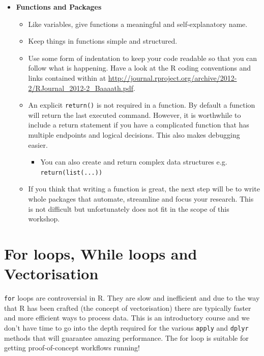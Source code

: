 \documentclass[a4paper]{book}
\providecommand{\tightlist}{%
  \setlength{\itemsep}{0pt}\setlength{\parskip}{0pt}}
\newenvironment{rmdblock}[1]
  {\vspace{1.5em}\begin{shaded*}
  \begin{itemize}
  \renewcommand{\labelitemi}{
    \raisebox{-.7\height}[0pt][0pt]{
      {\setkeys{Gin}{width=3em,keepaspectratio}\texttt{[image: images/\#1]}}
    }
  }
  \item
  }
  {
  \end{itemize}
  \end{shaded*}
  }
\newenvironment{rmdtip}
  {\begin{rmdblock}{tip}}
  {\end{rmdblock}}
\begin{document}
\begin{rmdtip}
\textbf{Functions and Packages}

\begin{itemize}
\item
  Like variables, give functions a meaningful and self-explanatory name.
\item
  Keep things in functions simple and structured.
\item
  Use some form of indentation to keep your code readable so that you
  can follow what is happening. Have a look at the R coding conventions
  and links contained within at
  \url{http://journal.rproject.org/archive/2012-2/RJournal_2012-2_Baaaath.pdf}.
\item
  An explicit \texttt{return()} is not required in a function. By
  default a function will return the last executed command. However, it
  is worthwhile to include a return statement if you have a complicated
  function that has multiple endpoints and logical decisions. This also
  makes debugging easier.

  \begin{itemize}
  \tightlist
  \item
    You can also create and return complex data structures e.g.
    \texttt{return(list(...))}
  \end{itemize}
\item
  If you think that writing a function is great, the next step will be
  to write whole packages that automate, streamline and focus your
  research. This is not difficult but unfortunately does not fit in the
  scope of this workshop.
\end{itemize}
\end{rmdtip}

\section{For loops, While loops and
Vectorisation}\label{for-loops-while-loops-and-vectorisation}

\texttt{for} loops are controversial in R. They are slow and inefficient
and due to the way that R has been crafted (the concept of
vectorisation) there are typically faster and more efficient ways to
process data. This is an introductory course and we don't have time to
go into the depth required for the various \texttt{apply} and
\texttt{dplyr} methods that will guarantee amazing performance. The for
loop is suitable for getting proof-of-concept workflows running!
\end{document}
